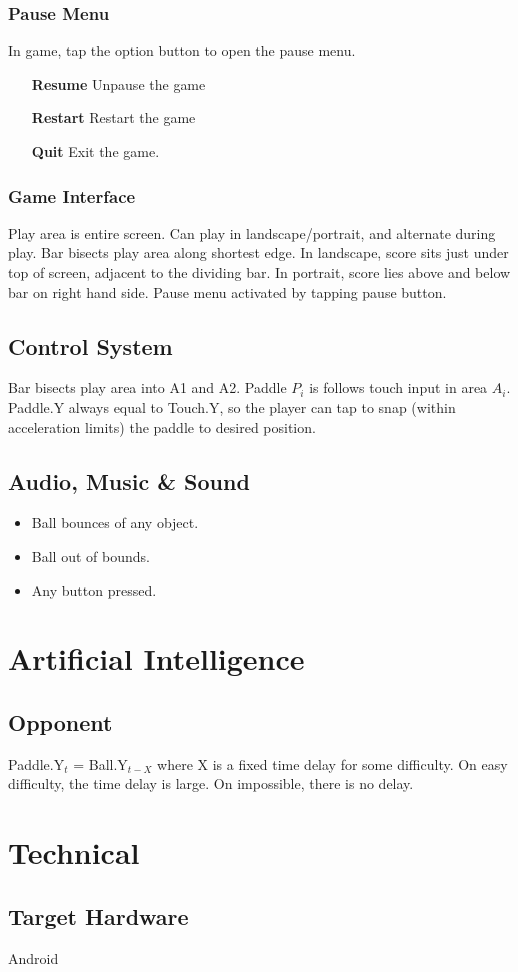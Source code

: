 \documentclass[12pt, letterpaper]{article}
\begin{document}
        \subsubsection{Pause Menu}
        In game, tap the option button to open the pause menu.
        \begin{itemize}
            \item[\textbf{Resume}] Unpause the game
            \item[\textbf{Restart}] Restart the game
            \item[\textbf{Quit}] Exit the game.
        \end{itemize}
        \subsubsection{Game Interface}
        Play area is entire screen. Can play in landscape/portrait, and alternate during play. Bar bisects play area along shortest edge. In landscape, score sits just under top of screen, adjacent to the dividing bar. In portrait, score lies above and below bar on right hand side. Pause menu activated by tapping pause button.
    \subsection{Control System}
    Bar bisects play area into A1 and A2. Paddle $P_i$ is follows touch input in area $A_i$. Paddle.Y always equal to Touch.Y, so the player can tap to snap (within acceleration limits) the paddle to desired position.
    \subsection{Audio, Music \& Sound}
    \begin{itemize}
        \item Ball bounces of any object.
        \item Ball out of bounds.
        \item Any button pressed.
    \end{itemize}
\section{Artificial Intelligence}
    \subsection{Opponent}
        Paddle.Y$_t$ = Ball.Y$_{t-X}$ where X is a fixed time delay for some difficulty. On easy difficulty, the time delay is large. On impossible, there is no delay.
\section{Technical}
    \subsection{Target Hardware}
    Android
\end{document}
